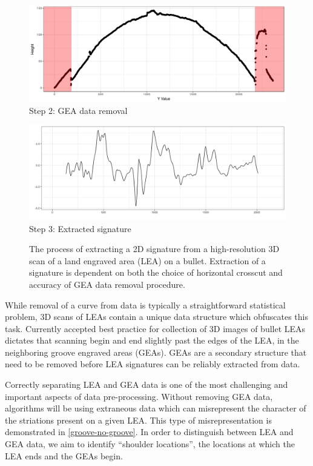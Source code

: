 \documentclass[12pt]{article}
\begin{document}
\begin{figure}
\begin{minipage}[b]{0.45\linewidth}
    \raggedleft
    \includegraphics[width=\textwidth]{../images/Profile_1_red_grooves.png}
    \centering
    Step 2: GEA data removal
\end{minipage}
\hspace{.2cm}
\begin{minipage}[b]{0.45\linewidth}
    \raggedright
    \includegraphics[width=\textwidth]{../images/signature.png}
    \centering
    Step 3: Extracted signature
\end{minipage}
\caption{The process of extracting a 2D signature from a high-resolution 3D scan of a land engraved area (LEA) on a bullet. Extraction of a signature is dependent on both the choice of horizontal crosscut and accuracy of GEA data removal procedure.}  
\label{processing-process}
\end{figure}

While removal of a curve from data is typically a straightforward
statistical problem, 3D scans of LEAs contain a unique data structure
which obfuscates this task. Currently accepted best practice for
collection of 3D images of bullet LEAs dictates that scanning begin and
end slightly past the edges of the LEA, in the neighboring groove
engraved areas (GEAs). GEAs are a secondary structure that need to be
removed before LEA signatures can be reliably extracted from data.

Correctly separating LEA and GEA data is one of the most challenging and
important aspects of data pre-processing. Without removing GEA data,
algorithms will be using extraneous data which can misrepresent the
character of the striations present on a given LEA. This type of
misrepresentation is demonstrated in \autoref{groove-no-groove}. In
order to distinguish between LEA and GEA data, we aim to identify
``shoulder locations'', the locations at which the LEA ends and the GEAs
begin.
\end{document}
